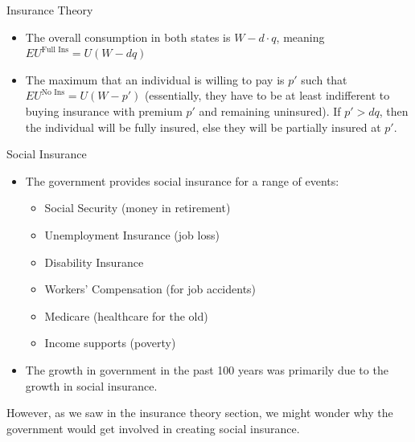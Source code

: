 \documentclass[10pt]{extarticle}
\begin{document}
\begin{problem}{Insurance Theory}
\begin{center}
    \end{center}
    \begin{itemize}
      \item The overall consumption in both states is $W - d\cdot q$, meaning $EU^{\text{Full Ins}} = U(W-dq)$
      \item The maximum that an individual is willing to pay is  $p'$ such that $EU^{\text{No Ins}} = U(W - p')$ (essentially, they have to be at least indifferent to buying insurance with premium $p'$ and remaining uninsured). If $p' > dq$, then the individual will be fully insured, else they will be partially insured at $p'$.
    \end{itemize}
  \end{problem}
  \begin{problem}{Social Insurance}
    \begin{itemize}
      \item The government provides social insurance for a range of events:
        \begin{itemize}
          \item Social Security (money in retirement)
          \item Unemployment Insurance (job loss)
          \item Disability Insurance
          \item Workers' Compensation (for job accidents)
          \item Medicare (healthcare for the old)
          \item Income supports (poverty)
        \end{itemize}
      \item The growth in government in the past 100 years was primarily due to the growth in social insurance.
    \end{itemize}
    However, as we saw in the insurance theory section, we might wonder why the government would get involved in creating social insurance.\\


\end{problem}
\end{document}
